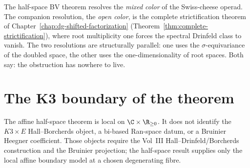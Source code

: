 The half-space BV theorem resolves the \emph{mixed color} of the Swiss-cheese
operad. The companion resolution, the \emph{open color}, is the
complete strictification theorem of
Chapter~\ref{chap:dg-shifted-factorization}
(Theorem~\ref{thm:complete-strictification}), where root multiplicity
one forces the spectral Drinfeld class to vanish. The two resolutions
are structurally parallel: one uses the $\sigma$-equivariance of the
doubled space, the other uses the one-dimensionality of root spaces.
Both say: the obstruction has nowhere to live.

\section{The K3 boundary of the theorem}
\label{sec:ahs-k3-boundary}

\begin{remark}[K3 boundary]
\label{rem:ahs-K3-boundary}
The affine half-space theorem is local on
$\C\times\R_{\ge 0}$. It does not identify the
$K3\times E$ Hall--Borcherds object, a bi-based Ran-space datum, or a
Bruinier Heegner coefficient. Those objects require the Vol~III
Hall--Drinfeld/Borcherds construction and the Bruinier projection; the
half-space result supplies only the local affine boundary model at a
chosen degenerating fibre.
\end{remark}
